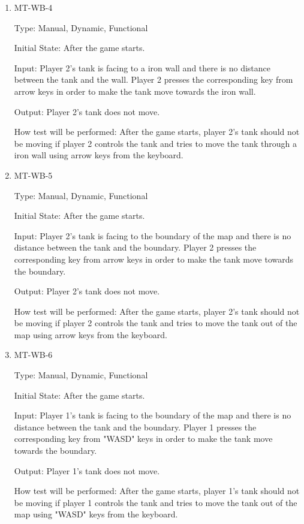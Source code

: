 \documentclass[12pt, titlepage]{article}
\begin{document}
\begin{enumerate}
\item{MT-WB-4\\}

Type: Manual, Dynamic, Functional
					
Initial State: After the game starts.
					
Input: Player 2's tank is facing to a iron wall and there is no distance between the tank and the wall. Player 2 presses the corresponding key from arrow keys in order to make the tank move towards the iron wall.
					
Output: Player 2's tank does not move.
					
How test will be performed: After the game starts, player 2's tank should not be moving if player 2 controls the tank and tries to move the tank through a iron wall using arrow keys from the keyboard.

\item{MT-WB-5\\}

Type: Manual, Dynamic, Functional
					
Initial State: After the game starts.
					
Input: Player 2's tank is facing to the boundary of the map and there is no distance between the tank and the boundary. Player 2 presses the corresponding key from arrow keys in order to make the tank move towards the boundary.
					
Output: Player 2's tank does not move.
					
How test will be performed: After the game starts, player 2's tank should not be moving if player 2 controls the tank and tries to move the tank out of the map using arrow keys from the keyboard.

\item{MT-WB-6\\}

Type: Manual, Dynamic, Functional
					
Initial State: After the game starts.
					
Input: Player 1's tank is facing to the boundary of the map and there is no distance between the tank and the boundary. Player 1 presses the corresponding key from "WASD" keys in order to make the tank move towards the boundary.
					
Output: Player 1's tank does not move.
					
How test will be performed: After the game starts, player 1's tank should not be moving if player 1 controls the tank and tries to move the tank out of the map using "WASD" keys from the keyboard.

\end{enumerate}
\end{document}
